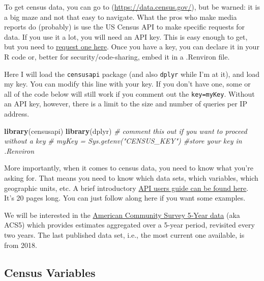 \documentclass[openany]{book}
\newenvironment{Shaded}{\begin{snugshade}}{\end{snugshade}}
\newcommand{\CommentTok}[1]{\textcolor[rgb]{0.56,0.35,0.01}{\textit{#1}}}
\newcommand{\KeywordTok}[1]{\textcolor[rgb]{0.13,0.29,0.53}{\textbf{#1}}}
\newcommand{\NormalTok}[1]{#1}
\begin{document}
To get census data, you can go to (\url{https://data.census.gov/}), but be warned: it is a big maze and not that easy to navigate. What the pros who make media reports do (probably) is use the US Census API to make specific requests for data. If you use it a lot, you will need an API key. This is easy enough to get, but you need to \href{https://api.census.gov/data/key_signup.html}{request one here}. Once you have a key, you can declare it in your R code or, better for security/code-sharing, embed it in a .Renviron file.

Here I will load the \texttt{censusapi} package (and also \texttt{dplyr} while I'm at it), and load my key. You can modify this line with your key. If you don't have one, some or all of the code below will still work if you comment out the \texttt{key=myKey}. Without an API key, however, there is a limit to the size and number of queries per IP address.

\begin{Shaded}
\begin{Highlighting}[]
\KeywordTok{library}\NormalTok{(censusapi)}
\KeywordTok{library}\NormalTok{(dplyr)}
\CommentTok{# comment this out if you want to proceed without a key}
\CommentTok{# myKey = Sys.getenv("CENSUS_KEY") #store your key in .Renviron}
\end{Highlighting}
\end{Shaded}

More importantly, when it comes to census data, you need to know what you're asking for. That means you need to know which data sets, which variables, which geographic units, etc. A brief introductory \href{https://www.census.gov/content/dam/Census/data/developers/api-user-guide/api-guide.pdf}{API users guide can be found here}. It's 20 pages long. You can just follow along here if you want some examples.

We will be interested in the \href{https://www.census.gov/data/developers/data-sets/acs-5year.html}{American Community Survey 5-Year data} (aka ACS5) which provides estimates aggregated over a 5-year period, revisited every two years. The last published data set, i.e., the most current one available, is from 2018.

\hypertarget{census-variables}{%
\subsection*{Census Variables}\label{census-variables}}
\end{document}
